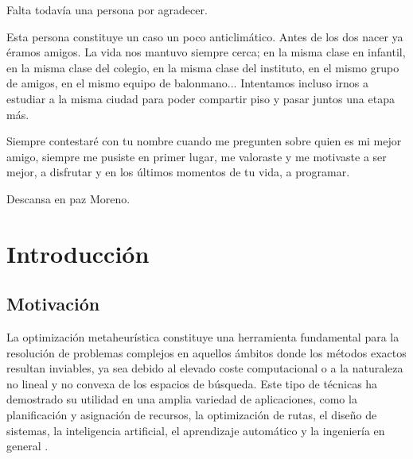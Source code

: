 \documentclass[12pt,a4paper,twoside,openright]{book}
\begin{document}
\begin{umaacknowledgments}
    Falta todavía una persona por agradecer. 
    
    Esta persona constituye un caso un poco anticlimático. Antes de los dos nacer ya éramos amigos. 
    La vida nos mantuvo siempre cerca; en la misma clase en infantil, en la misma clase del colegio, en la misma clase del instituto, en el mismo grupo de amigos, en el mismo equipo de balonmano... Intentamos incluso irnos a estudiar a la misma ciudad para poder compartir piso y pasar juntos una etapa más. 
    
    Siempre contestaré con tu nombre cuando me pregunten sobre quien es mi mejor amigo, siempre me pusiste en primer lugar, me valoraste y me motivaste a ser mejor, a disfrutar y en los últimos momentos de tu vida, a programar.  
    
    Descansa en paz Moreno.


\end{umaacknowledgments}

\clearpage
{
\fontsize{14}{16}\selectfont
\tableofcontents
}\clearpage
\listoffigures
\clearpage
\listoftables
\clearpage



\mainmatter

\chapter{Introducción}

\section{Motivación}

    La optimización metaheurística constituye una herramienta fundamental para la resolución de problemas complejos en aquellos ámbitos donde los métodos exactos resultan inviables, ya sea debido al elevado coste computacional o a la naturaleza no lineal y no convexa de los espacios de búsqueda. Este tipo de técnicas ha demostrado su utilidad en una amplia variedad de aplicaciones, como la planificación y asignación de recursos, la optimización de rutas, el diseño de sistemas, la inteligencia artificial, el aprendizaje automático y la ingeniería en general \cite{blum2003metaheuristics}.
\end{document}
